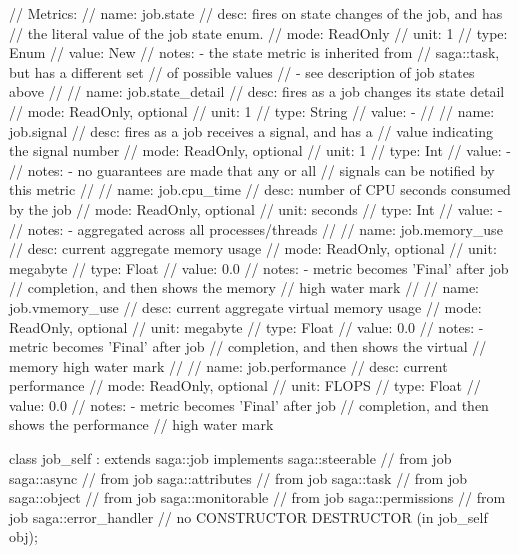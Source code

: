 \begin{myspec}
{{ 
      // Metrics:
      //   name:  job.state
      //   desc:  fires on state changes of the job, and has 
      //          the literal value of the job state enum.
      //   mode:  ReadOnly
      //   unit:  1
      //   type:  Enum
      //   value: New
      //   notes: - the state metric is inherited from
      //            saga::task, but has a different set
      //            of possible values
      //          - see description of job states above
      // 
      //   name:  job.state_detail
      //   desc:  fires as a job changes its state detail
      //   mode:  ReadOnly, optional
      //   unit:  1
      //   type:  String
      //   value: -
      // 
      //   name:  job.signal
      //   desc:  fires as a job receives a signal, and has a
      //          value indicating the signal number
      //   mode:  ReadOnly, optional
      //   unit:  1
      //   type:  Int
      //   value: -
      //   notes: - no guarantees are made that any or all
      //            signals can be notified by this metric
      // 
      //   name:  job.cpu_time
      //   desc:  number of CPU seconds consumed by the job
      //   mode:  ReadOnly, optional
      //   unit:  seconds
      //   type:  Int
      //   value: -
      //   notes: - aggregated across all processes/threads
      // 
      //   name:  job.memory_use
      //   desc:  current aggregate memory usage
      //   mode:  ReadOnly, optional
      //   unit:  megabyte
      //   type:  Float
      //   value: 0.0
      //   notes: - metric becomes 'Final' after job 
      //            completion, and then shows the memory 
      //            high water mark
      // 
      //   name:  job.vmemory_use
      //   desc:  current aggregate virtual memory usage
      //   mode:  ReadOnly, optional
      //   unit:  megabyte
      //   type:  Float
      //   value: 0.0
      //   notes: - metric becomes 'Final' after job 
      //            completion, and then shows the virtual 
      //            memory high water mark
      // 
      //   name:  job.performance
      //   desc:  current performance
      //   mode:  ReadOnly, optional
      //   unit:  FLOPS
      //   type:  Float
      //   value: 0.0
      //   notes: - metric becomes 'Final' after job 
      //            completion, and then shows the performance
      //            high water mark
    }
 
 
    class job_self : extends     saga::job
                     implements  saga::steerable
                  // from job    saga::async
                  // from job    saga::attributes
                  // from job    saga::task
                  // from job    saga::object
                  // from job    saga::monitorable
                  // from job    saga::permissions
                  // from job    saga::error_handler
    {
      // no CONSTRUCTOR
      DESTRUCTOR           (in  job_self        obj);
    }
  }
 \end{myspec}
 
